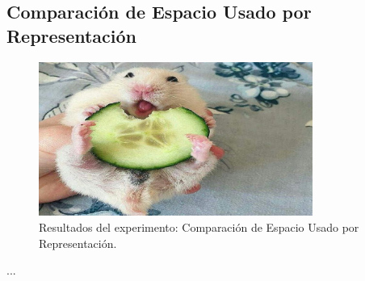 \subsection{Comparación de Espacio Usado por Representación}
\label{exp:space-comparison}

\begin{figure}[H]
    \centering
    \includegraphics[width=0.8\textwidth]{testing/images/space_comparison.png}
    \caption{Resultados del experimento: Comparación de Espacio Usado por Representación.}
    \label{fig:space-comparison}
\end{figure}

...
